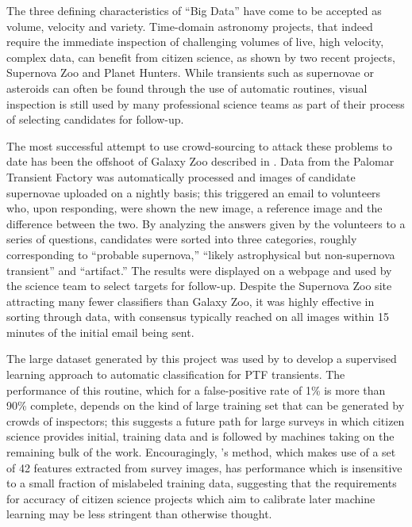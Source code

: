 \documentclass{ar2e}
\def\CaseStudy#1{\noindent{\it\bf #1 \,\,\,\,}}
\begin{document}

\CaseStudy{Time domain astronomy: Supernova Zoo and Planet Hunters}  
\label{SNZoo} 
The three defining characteristics of ``Big Data'' have come to be accepted as
volume, velocity and variety.  Time-domain astronomy projects, that indeed
require the immediate inspection of challenging volumes of live, high velocity,
complex data, can benefit from citizen science, as shown by two recent projects,
Supernova Zoo and Planet Hunters.   While transients such as supernovae or
asteroids can often be found through the use of automatic routines, visual
inspection is still used by many professional science teams as part of their
process of selecting candidates for follow-up. 

The most successful attempt to use crowd-sourcing to attack these problems to
date has been the offshoot of Galaxy Zoo described in \citet{SmithSN}.  Data
from the Palomar Transient Factory \citep{LawPTF} was automatically processed
and images of candidate supernovae uploaded on a nightly basis; this triggered
an email to volunteers who, upon responding, were shown the new image, a
reference image and the difference between the two. By analyzing the answers
given by the volunteers to a series of questions, candidates were sorted into 
three categories, roughly corresponding to ``probable supernova,'' ``likely
astrophysical but non-supernova transient'' and ``artifact.'' The results were
displayed on a webpage and used by the science team to select targets for
follow-up. Despite the Supernova Zoo site attracting many fewer classifiers 
than Galaxy Zoo, it was highly effective in sorting through data,  with
consensus typically reached on all images within 15 minutes of the initial email
being sent. 

The large dataset generated by this project was used by \citet{Brink} to develop
a supervised learning approach to automatic classification for PTF transients.
The performance of this routine, which for a false-positive rate of 1\% is more
than 90\% complete, depends on the kind of large training set that can be
generated by crowds of inspectors; this suggests a future path for large surveys
in which citizen science provides initial, training data and is followed by
machines taking on the remaining bulk of the work. Encouragingly,
\citeauthor{Brink}'s method, which makes use of a set of 42 features extracted
from survey images, has performance which is insensitive to a small fraction of
mislabeled training data, suggesting that the requirements for accuracy of
citizen science projects which aim to calibrate later machine learning may be
less stringent than otherwise thought. 
\end{document}
